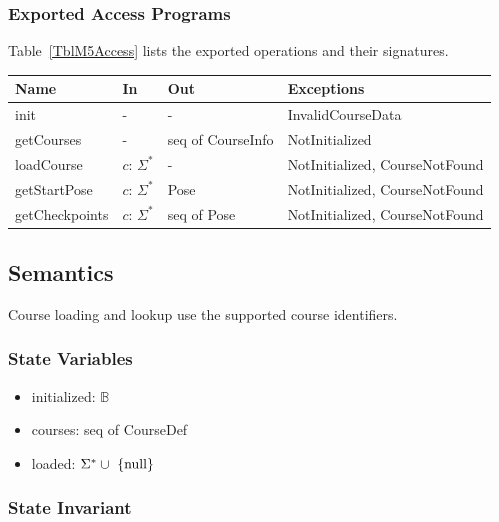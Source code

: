 \documentclass[12pt, titlepage]{article}
\newcommand{\nul}{\textnormal{null}}
\begin{document}
\subsubsection{Exported Access Programs}

Table~\ref{TblM5Access} lists the exported operations and their signatures.

\begin{center}
\begin{minipage}{\textwidth}
\begin{tabularx}{\textwidth}{p{3cm} p{2.2cm} p{3.2cm} X}
\toprule
\textbf{Name} & \textbf{In} & \textbf{Out} & \textbf{Exceptions} \\
\midrule
init & - & - & InvalidCourseData \\
getCourses & - & seq of CourseInfo & NotInitialized \\
loadCourse & $c$: $\Sigma^*$ & - & NotInitialized, CourseNotFound \\
getStartPose & $c$: $\Sigma^*$ & Pose & NotInitialized, CourseNotFound \\
getCheckpoints & $c$: $\Sigma^*$ & seq of Pose & NotInitialized, CourseNotFound
\\
\bottomrule
\end{tabularx}
\label{TblM5Access}
\end{minipage}
\end{center}

\subsection{Semantics}

Course loading and lookup use the supported course identifiers.

\subsubsection{State Variables}

\begin{itemize}
\item initialized: $\mathbb{B}$
\item courses: seq of CourseDef
\item loaded: $\Sigma^* \cup \ \{\nul\}$
\end{itemize}

\subsubsection{State Invariant}
\end{document}
